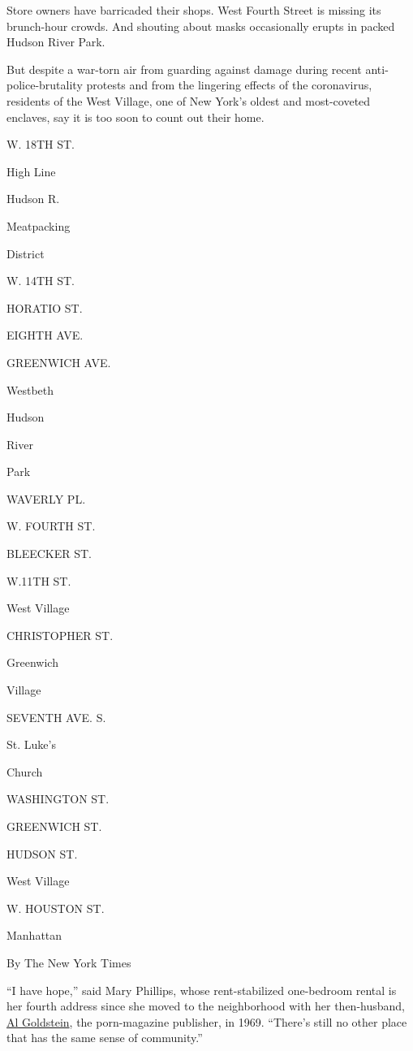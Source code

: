 Store owners have barricaded their shops. West Fourth Street is missing
its brunch-hour crowds. And shouting about masks occasionally erupts in
packed Hudson River Park.

But despite a war-torn air from guarding against damage during recent
anti-police-brutality protests and from the lingering effects of the
coronavirus, residents of the West Village, one of New York's oldest and
most-coveted enclaves, say it is too soon to count out their home.

W. 18TH ST.

High Line

Hudson R.

Meatpacking

District

W. 14TH ST.

HORATIO ST.

EIGHTH AVE.

GREENWICH AVE.

Westbeth

Hudson

River

Park

WAVERLY PL.

W. FOURTH ST.

BLEECKER ST.

W.11TH ST.

West Village

CHRISTOPHER ST.

Greenwich

Village~

SEVENTH AVE. S.

St. Luke's

Church

WASHINGTON ST.

GREENWICH ST.

HUDSON ST.

West Village

W. HOUSTON ST.

Manhattan

By The New York Times

``I have hope,'' said Mary Phillips, whose rent-stabilized one-bedroom
rental is her fourth address since she moved to the neighborhood with
her then-husband,
\href{https://www.nytimes3xbfgragh.onion/2013/12/20/nyregion/al-goldstein-pioneering-pornographer-dies-at-77.html}{Al
Goldstein}, the porn-magazine publisher, in 1969. ``There's still no
other place that has the same sense of community.''

